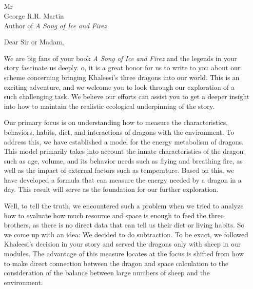 \documentclass[12pt, letterpaper]{letter} %
\begin{document}

\begin{letter}{
    \quad\\
    \quad\\
    \quad\\
    \quad\\
	Mr\\
	George R.R. Martin \\
    Author of \textit{A Song of Ice and Firez}
}


\opening{Dear Sir or Madam,}


We are big fans of your book \textit{A Song of Ice and Firez} and the legends in your story fascinate us deeply. o, it is a great honor for us to write to you about our scheme concerning bringing Khaleesi's three dragons into our world. This is an exciting adventure, and we welcome you to look through our exploration of a such challenging task. We believe our efforts can assist you to get a deeper insight into how to maintain the realistic ecological underpinning of the story.

 Our primary focus is on understanding how to measure the characteristics, behaviors, habits, diet, and interactions of dragons with the environment. To address this, we have established a model for the energy metabolism of dragons. This model primarily takes into account the innate characteristics of the dragon such as age, volume, and its behavior needs such as flying and breathing fire, as well as the impact of external factors such as temperature. Based on this, we have developed a formula that can measure the energy needed by a dragon in a day. This result will serve as the foundation for our further exploration.
 
Well, to tell the truth, we encountered such a problem when we tried to analyze how to evaluate how much resource and space is enough to feed the three brothers, as there is no direct data that can tell us their diet or living habits. So we come up with an idea: We decided to do subtraction. To be exact, we followed Khaleesi's decision in your story and served the dragons only with sheep in our modules. The advantage of this measure locates at the focus is shifted from how to make direct connection between the dragon and space calculation to the consideration of the balance between large numbers of sheep and the environment.


\end{letter}
\end{document}
